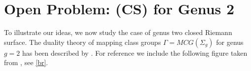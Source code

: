 \documentclass[12pt]{amsart}
\theoremstyle{definition}
\theoremstyle{remark}
\newcommand{\sC}{\mathscr{C}}
\newcommand{\sT}{\mathscr{T}}
\begin{document}



\section{Open Problem: (CS) for Genus 2}
To illustrate our ideas, we now study the case of genus two closed Riemann surface. The duality theory of mapping class groups $\Gamma=MCG(\Sigma_g)$ for genus $g=2$ has been described by \cite{Broaddus2012}. For reference we include the following figure taken from \cite[Fig.10]{Broaddus2012}, see \eqref{br}.%
\end{document}
